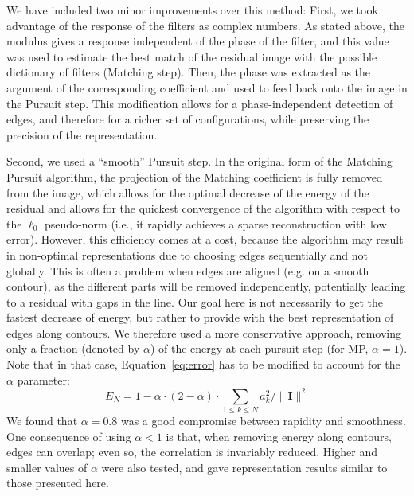 \documentclass[a4paper, 11pt]{book}
\newcommand{\image}{\mathbf{I}} %
\begin{document}
We have included two minor improvements over this method:
First, we took advantage of the response of the filters as complex numbers.
As stated above, the modulus gives a response independent of the phase of the filter,
and this value was used to estimate the best match of the residual image
with the possible dictionary of filters (Matching step).
Then, the phase was extracted as the argument of the corresponding coefficient
and used to feed back onto the image in the Pursuit step.
This modification allows for a phase-independent detection of edges,
and therefore for a richer set of configurations,
while preserving the precision of the representation.

Second, we used a ``smooth'' Pursuit step.
In the original form of the Matching Pursuit algorithm,
the projection of the Matching coefficient is fully removed from the image,
which allows for the optimal decrease of the energy of the residual
and allows for the quickest convergence of the algorithm
with respect to the $\ell_0$ pseudo-norm
(i.e., it rapidly achieves a sparse reconstruction with low error).
However, this efficiency comes at a cost,
because the algorithm may result in non-optimal representations
due to choosing edges sequentially and not globally.
This is often a problem when edges are aligned (e.g. on a smooth contour),
as the different parts will be removed independently, potentially leading
to a residual with gaps in the line.
Our goal here is not necessarily to get the fastest decrease of energy,
but rather to provide with the best representation of edges along contours.
We therefore used a more conservative approach,
removing only a fraction (denoted by $\alpha$)
of the energy at each pursuit step (for MP, $\alpha=1$).
Note that in that case, Equation~\ref{eq:error} has to be modified to account for the $\alpha$ parameter:
\begin{equation}%
E_N =  1 - \alpha\cdot(2-\alpha)\cdot \sum_{1\leq k\leq N} a_{k}^2 / \| \image \| ^2%
\label{eq:error_alpha}%
\end{equation}%
We found that $\alpha=0.8$ was a good compromise between rapidity and smoothness.
One consequence of using $\alpha<1$ is that, when removing energy along contours,
edges can overlap; even so, the correlation is invariably reduced.
Higher and smaller values of $\alpha$ were also tested,
and gave representation results similar to those presented here.
\end{document}
